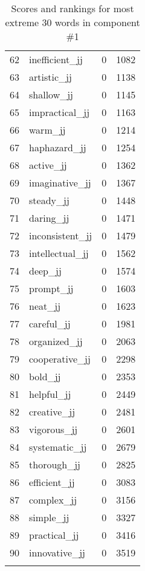 \begin{longtable}[!htbp]{| rlr@{.}l |}
    62 & inefficient\_jj & 0 & 1082 \\
    63 & artistic\_jj & 0 & 1138 \\
    64 & shallow\_jj & 0 & 1145 \\
    65 & impractical\_jj & 0 & 1163 \\
    66 & warm\_jj & 0 & 1214 \\
    67 & haphazard\_jj & 0 & 1254 \\
    68 & active\_jj & 0 & 1362 \\
    69 & imaginative\_jj & 0 & 1367 \\
    70 & steady\_jj & 0 & 1448 \\
    71 & daring\_jj & 0 & 1471 \\
    72 & inconsistent\_jj & 0 & 1479 \\
    73 & intellectual\_jj & 0 & 1562 \\
    74 & deep\_jj & 0 & 1574 \\
    75 & prompt\_jj & 0 & 1603 \\
    76 & neat\_jj & 0 & 1623 \\
    77 & careful\_jj & 0 & 1981 \\
    78 & organized\_jj & 0 & 2063 \\
    79 & cooperative\_jj & 0 & 2298 \\
    80 & bold\_jj & 0 & 2353 \\
    81 & helpful\_jj & 0 & 2449 \\
    82 & creative\_jj & 0 & 2481 \\
    83 & vigorous\_jj & 0 & 2601 \\
    84 & systematic\_jj & 0 & 2679 \\
    85 & thorough\_jj & 0 & 2825 \\
    86 & efficient\_jj & 0 & 3083 \\
    87 & complex\_jj & 0 & 3156 \\
    88 & simple\_jj & 0 & 3327 \\
    89 & practical\_jj & 0 & 3416 \\
    90 & innovative\_jj & 0 & 3519 \\
    \hline
    \caption{Scores and rankings for most extreme 30 words in component \#1} \\
\end{longtable}
